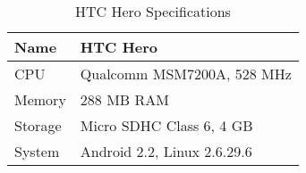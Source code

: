\begin{table}
  \centering
  \caption{HTC Hero Specifications}
  \begin{tabular}{ | l | l |}
    \hline
    Name    & HTC Hero                          \\ \hline
    CPU     & Qualcomm MSM7200A, 528 MHz        \\ \hline
    Memory  & 288 MB \ac{RAM}                   \\ \hline
    Storage & Micro SDHC Class 6, 4 GB          \\ \hline
    System  & Android 2.2, Linux 2.6.29.6      \\ \hline
  \end{tabular}
  \label{tbl:device:hero}
\end{table}
